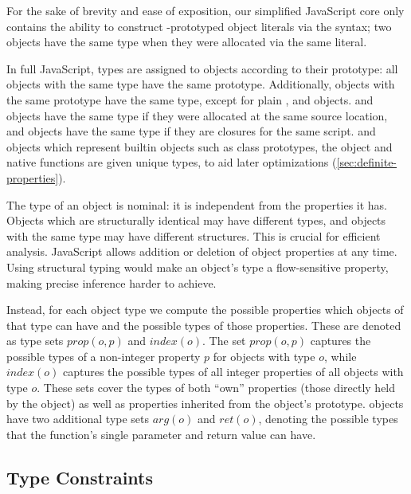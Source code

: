 For the sake of brevity and ease of exposition, our simplified JavaScript core
only contains the ability to construct -prototyped object
literals via the \code{\{\}} syntax;
two objects have the same type when they were allocated via the same literal.

In full JavaScript, types are assigned to objects according to their prototype:
all objects with the same type have the same prototype.
Additionally, objects with the same prototype have the same type,
except for plain ,  and  objects.
 and  objects have the same type if they were
allocated at the same source location,
and  objects have the same type if they are closures
for the same script.
 and  objects which represent builtin objects
such as class prototypes, the  object and native functions
are given unique types, to aid later optimizations
(\Section\ref{sec:definite-properties}).

The type of an object is nominal: it is independent from the properties it
has. Objects which are structurally identical may have different types, and
objects with the same type may have different structures. This is crucial for
efficient analysis. JavaScript allows addition or deletion of object properties
at any time. Using structural typing would make an object's type a
flow-sensitive property, making precise inference harder to achieve.

Instead, for each object type we compute the possible properties which
objects of that type can have and the possible types of those properties.
These are denoted as type sets $\mathit{prop}(o,p)$ and
$\mathit{index}(o)$. The set $\mathit{prop}(o,p)$ captures the possible types
of a non-integer property $p$ for objects with type $o$, while
$\mathit{index}(o)$ captures the possible types of all integer properties of
all objects with type $o$.
These sets cover the types of both ``own'' properties (those directly held
by the object) as well as properties inherited from the object's prototype.
 objects have two additional type sets
$\mathit{arg}(o)$ and $\mathit{ret}(o)$, denoting
the possible types that the function's single parameter and return value can have.

\subsection{Type Constraints}
\label{sec:constraints}

